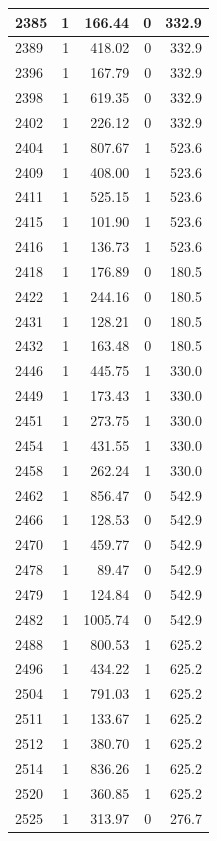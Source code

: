 \documentclass[
  spanish,
  12pt,
]{book}
\begin{document}
\begin{tabular}{l|r|r|r|r}
\hline
2385 & 1 & 166.44 & 0 & 332.9\\
\hline
2389 & 1 & 418.02 & 0 & 332.9\\
\hline
2396 & 1 & 167.79 & 0 & 332.9\\
\hline
2398 & 1 & 619.35 & 0 & 332.9\\
\hline
2402 & 1 & 226.12 & 0 & 332.9\\
\hline
2404 & 1 & 807.67 & 1 & 523.6\\
\hline
2409 & 1 & 408.00 & 1 & 523.6\\
\hline
2411 & 1 & 525.15 & 1 & 523.6\\
\hline
2415 & 1 & 101.90 & 1 & 523.6\\
\hline
2416 & 1 & 136.73 & 1 & 523.6\\
\hline
2418 & 1 & 176.89 & 0 & 180.5\\
\hline
2422 & 1 & 244.16 & 0 & 180.5\\
\hline
2431 & 1 & 128.21 & 0 & 180.5\\
\hline
2432 & 1 & 163.48 & 0 & 180.5\\
\hline
2446 & 1 & 445.75 & 1 & 330.0\\
\hline
2449 & 1 & 173.43 & 1 & 330.0\\
\hline
2451 & 1 & 273.75 & 1 & 330.0\\
\hline
2454 & 1 & 431.55 & 1 & 330.0\\
\hline
2458 & 1 & 262.24 & 1 & 330.0\\
\hline
2462 & 1 & 856.47 & 0 & 542.9\\
\hline
2466 & 1 & 128.53 & 0 & 542.9\\
\hline
2470 & 1 & 459.77 & 0 & 542.9\\
\hline
2478 & 1 & 89.47 & 0 & 542.9\\
\hline
2479 & 1 & 124.84 & 0 & 542.9\\
\hline
2482 & 1 & 1005.74 & 0 & 542.9\\
\hline
2488 & 1 & 800.53 & 1 & 625.2\\
\hline
2496 & 1 & 434.22 & 1 & 625.2\\
\hline
2504 & 1 & 791.03 & 1 & 625.2\\
\hline
2511 & 1 & 133.67 & 1 & 625.2\\
\hline
2512 & 1 & 380.70 & 1 & 625.2\\
\hline
2514 & 1 & 836.26 & 1 & 625.2\\
\hline
2520 & 1 & 360.85 & 1 & 625.2\\
\hline
2525 & 1 & 313.97 & 0 & 276.7\\

\end{tabular}
\end{document}

